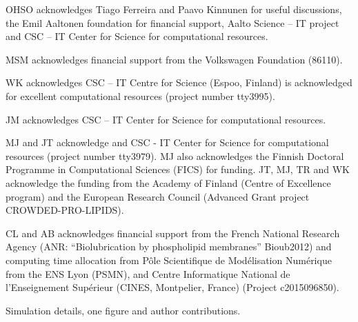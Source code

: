 \documentclass[journal=jacsat,manuscript=article]{achemso}
\begin{document}
\begin{acknowledgement}


OHSO acknowledges Tiago Ferreira and Paavo Kinnunen for useful discussions, 
the Emil Aaltonen foundation for financial support, 
Aalto Science -- IT project and CSC -- IT Center for Science for computational resources. 

MSM acknowledges financial support from the Volkswagen Foundation (86110).

WK acknowledges CSC -- IT Centre for Science (Espoo, Finland) is acknowledged for excellent computational resources (project number tty3995).

JM acknowledges CSC -- IT Center for Science for computational resources.


MJ and JT acknowledge and CSC - IT Center for Science for computational resources (project number tty3979).
MJ also acknowledges the Finnish Doctoral Programme in Computational Sciences (FICS) for funding.
JT, MJ, TR and WK acknowledge the funding from the Academy of Finland (Centre of Excellence program) 
and the European Research Council (Advanced Grant project CROWDED-PRO-LIPIDS).

CL and AB acknowledges financial support from the French National Research Agency
(ANR: “Biolubrication by phospholipid membranes” Bioub2012) and
computing time allocation from P{\^o}le Scientifique de Mod{\'e}lisation Num{\'e}rique from the ENS Lyon (PSMN),
and Centre Informatique National de l'Enseignement Sup{\'e}rieur (CINES, Montpelier, France)
(Project c2015096850).

\end{acknowledgement}

\begin{suppinfo}

Simulation details, one figure and author contributions.


\end{suppinfo}
\end{document}
